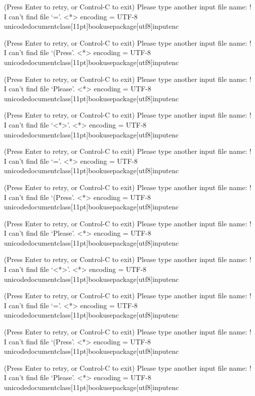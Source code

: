 (Press Enter to retry, or Control-C to exit)
Please type another input file name: ! I can't find file `='.
<*> encoding 
             = UTF-8 unicodedocumentclass[11pt]{book}usepackage[utf8]{inputenc}

(Press Enter to retry, or Control-C to exit)
Please type another input file name: ! I can't find file `(Press'.
<*> encoding 
             = UTF-8 unicodedocumentclass[11pt]{book}usepackage[utf8]{inputenc}

(Press Enter to retry, or Control-C to exit)
Please type another input file name: ! I can't find file `Please'.
<*> encoding 
             = UTF-8 unicodedocumentclass[11pt]{book}usepackage[utf8]{inputenc}

(Press Enter to retry, or Control-C to exit)
Please type another input file name: ! I can't find file `<*>'.
<*> encoding 
             = UTF-8 unicodedocumentclass[11pt]{book}usepackage[utf8]{inputenc}

(Press Enter to retry, or Control-C to exit)
Please type another input file name: ! I can't find file `='.
<*> encoding 
             = UTF-8 unicodedocumentclass[11pt]{book}usepackage[utf8]{inputenc}

(Press Enter to retry, or Control-C to exit)
Please type another input file name: ! I can't find file `(Press'.
<*> encoding 
             = UTF-8 unicodedocumentclass[11pt]{book}usepackage[utf8]{inputenc}

(Press Enter to retry, or Control-C to exit)
Please type another input file name: ! I can't find file `Please'.
<*> encoding 
             = UTF-8 unicodedocumentclass[11pt]{book}usepackage[utf8]{inputenc}

(Press Enter to retry, or Control-C to exit)
Please type another input file name: ! I can't find file `<*>'.
<*> encoding 
             = UTF-8 unicodedocumentclass[11pt]{book}usepackage[utf8]{inputenc}

(Press Enter to retry, or Control-C to exit)
Please type another input file name: ! I can't find file `='.
<*> encoding 
             = UTF-8 unicodedocumentclass[11pt]{book}usepackage[utf8]{inputenc}

(Press Enter to retry, or Control-C to exit)
Please type another input file name: ! I can't find file `(Press'.
<*> encoding 
             = UTF-8 unicodedocumentclass[11pt]{book}usepackage[utf8]{inputenc}

(Press Enter to retry, or Control-C to exit)
Please type another input file name: ! I can't find file `Please'.
<*> encoding 
             = UTF-8 unicodedocumentclass[11pt]{book}usepackage[utf8]{inputenc}

